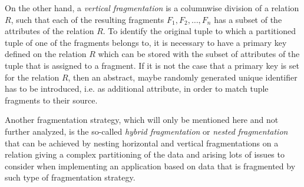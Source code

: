 On the other hand, a \emph{vertical fragmentation} \cite[p.~122]{Ozsu1991} is a columnwise division of a relation $R$, such that each of the resulting
fragments $F_1,F_2,\dots,F_n$ has a subset of the attributes of the relation $R$. To identify the original tuple to which a partitioned tuple of one of the
fragments belongs to, it is necessary to have a primary key defined on the relation $R$ which can be stored with the subset of attributes of the tuple that is
assigned to a fragment. If it is not the case that a primary key is set for the relation $R$, then an abstract, maybe randomly generated unique identifier has 
to be introduced, i.e. as additional attribute, in order to match tuple fragments to their source. 

Another fragmentation strategy, which will only be mentioned here and not further analyzed, is the so-called \emph{hybrid fragmentation} or 
\emph{nested fragmentation} \cite[p.~135f.]{Ozsu1991} that can be achieved by nesting horizontal and vertical fragmentations on a relation giving a complex
partitioning of the data and arising lots of issues to consider when implementing an application based on data that is fragmented by such type of fragmentation
strategy.

